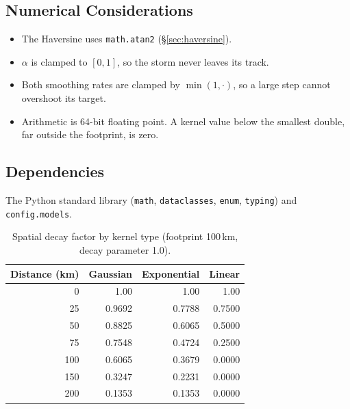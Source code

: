 \documentclass[11pt,a4paper]{article}
\begin{document}
\subsection{Numerical Considerations}

\begin{itemize}[nosep]
    \item The Haversine uses \texttt{math.atan2} (\S\ref{sec:haversine}).
    \item $\alpha$ is clamped to $[0, 1]$, so the storm never leaves its track.
    \item Both smoothing rates are clamped by $\min(1,\cdot)$, so a large step cannot
          overshoot its target.
    \item Arithmetic is 64-bit floating point. A kernel value below the smallest
          double, far outside the footprint, is zero.
\end{itemize}

\subsection{Dependencies}

The Python standard library (\texttt{math}, \texttt{dataclasses}, \texttt{enum},
\texttt{typing}) and \texttt{config.models}.

\mkmsensitivity

\begin{table}[H]
    \centering
    \caption{Spatial decay factor by kernel type (footprint 100\,km, decay parameter 1.0).}
    \label{tab:sens_decay_kernel}
    \begin{tabular}{rrrr}
        \toprule
        \textbf{Distance (km)} & \textbf{Gaussian} & \textbf{Exponential} & \textbf{Linear} \\
        \midrule
        0 & 1.00 & 1.00 & 1.00 \\
        25 & 0.9692 & 0.7788 & 0.7500 \\
        50 & 0.8825 & 0.6065 & 0.5000 \\
        75 & 0.7548 & 0.4724 & 0.2500 \\
        100 & 0.6065 & 0.3679 & 0.0000 \\
        150 & 0.3247 & 0.2231 & 0.0000 \\
        200 & 0.1353 & 0.1353 & 0.0000 \\
        \bottomrule
    \end{tabular}
\end{table}
\end{document}
